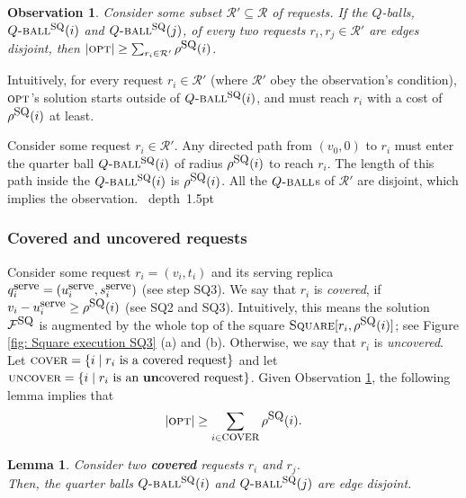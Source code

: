 \documentclass[11pt]{article}
\newtheorem{lem}[theorem]{Lemma}
\newtheorem{observation}[theorem]{Observation}
\def\proof{\par\noindent{\bf Proof:~}}
\def\blackslug{\hbox{\hskip 1pt \vrule width 4pt height 8pt
    depth 1.5pt \hskip 1pt}}
\def\QED{\quad\blackslug\lower 8.5pt\null\par}
\newcommand{\calF}{\mathcal{F}}
\newcommand{\calR}{\mathcal{R}}
\newcommand{\opt}{\mbox{\textsc{opt}}}
\newcommand{\Square}[0]{\mbox{\sc Square}}
\newcommand{\rr}{r}
\newcommand{\qSQ}{q^{\mbox{\small\upshape serve}}}
\newcommand{\uSQ}{u^{\mbox{\small\upshape serve}}}
\newcommand{\sSQ}{s^{\mbox{\small\upshape serve}}}
\newcommand{\FSQ}[0]{\calF^{\mbox{\small\upshape SQ}}}
\newcommand{\rhoSQ}[0]{\rho^{\mbox{\small\upshape SQ}}}
\newcommand{\SQball}[0]{Q{\mbox{\sc -ball}}^{\mbox{\sc sq}}}
\newcommand{\uncover}[0]{\mbox{\sc uncover}}
\newcommand{\cover}[0]{\mbox{\sc cover}}
\newcommand{\Qball}[0]{Q{\mbox{\sc -ball}}}
\begin{document}
\begin{observation}
Consider some subset $\calR'\subseteq\calR$ of requests.
If the $Q$-balls, $\SQball(i)$ and
$\SQball(j)$, of every two requests $\rr_i,\rr_j\in\calR'$  are edges disjoint, then
$|\opt| \geq \sum_{r_i\in\calR'} \rhoSQ(i)$.
\label{obser:sqr:opt geq sum rho_i}
\end{observation}
Intuitively, for every request $r_i\in\calR'$ (where $\calR'$ obey the observation's condition), $\opt$'s solution starts outside of $\SQball(i)$,
and must reach $r_i$ with a cost of $\rhoSQ(i)$ at least.
\proof
Consider some request $r_i \in \calR'$.
Any directed path from $(v_0,0)$ to $r_i$ must enter the quarter ball $\SQball(i)$ of radius $\rhoSQ(i)$ to reach $r_i$.
The length of this path inside the $\SQball(i)$ is $\rhoSQ(i)$.
All the $\Qball$s of $\calR'$ are disjoint, which implies the observation.
\QED






\subsubsection{Covered and uncovered requests}
Consider some request $\rr_i=(v_i,t_i)$ and its serving replica $\qSQ_i=(\uSQ_i,\sSQ_i)$
(see step SQ3).
We say that $\rr_i$  is {\em covered}, if $v_i-\uSQ_i \geq \rhoSQ(i)$ (see SQ2 and SQ3).
Intuitively, this means the solution $\FSQ$ is augmented by the whole top of the square $\Square[r_i,\rhoSQ(i)]$; see Figure \ref{fig: Square execution SQ3} (a) and (b).
Otherwise, we say that $\rr_i$ is {\em uncovered}.
Let $\cover=\{i \mid r_i \mbox{ is a covered request}\}$ and let $\uncover=\{i \mid r_i \mbox{ is an {\bf un}covered request}\}$.
Given Observation \ref{obser:sqr:opt geq sum rho_i},
the following lemma implies that
\begin{eqnarray}
|\opt|\geq \sum_{i\in\cover}\rhoSQ(i).
\label{ineq:sqr: opt geq sum cover radii}
\end{eqnarray}




\begin{lem}
Consider two {\bf covered} requests $\rr_i$ and $\rr_j$.\\
Then, the  quarter balls
$\SQball(i)$ and $\SQball(j)$
are edge disjoint.
\label{lem:Square: covered requests are edges disjoint}
\end{lem}
\end{document}
